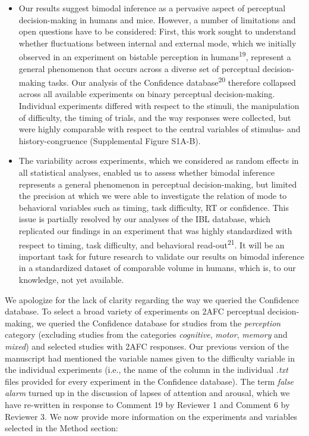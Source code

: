 \documentclass[
]{article}
\begin{document}
\begin{itemize}
\item
  Our results suggest bimodal inference as a pervasive aspect of
  perceptual decision-making in humans and mice. However, a number of
  limitations and open questions have to be considered: First, this work
  sought to understand whether fluctuations between internal and
  external mode, which we initially observed in an experiment on
  bistable perception in humans\textsuperscript{19}, represent a general
  phenomenon that occurs across a diverse set of perceptual
  decision-making tasks. Our analysis of the Confidence
  database\textsuperscript{20} therefore collapsed across all available
  experiments on binary perceptual decision-making. Individual
  experiments differed with respect to the stimuli, the manipulation of
  difficulty, the timing of trials, and the way responses were
  collected, but were highly comparable with respect to the central
  variables of stimulus- and history-congruence (Supplemental Figure
  S1A-B).
\item
  The variability across experiments, which we considered as random
  effects in all statistical analyses, enabled us to assess whether
  bimodal inference represents a general phenomenon in perceptual
  decision-making, but limited the precision at which we were able to
  investigate the relation of mode to behavioral variables such as
  timing, task difficulty, RT or confidence. This issue is partially
  resolved by our analyses of the IBL database, which replicated our
  findings in an experiment that was highly standardized with respect to
  timing, task difficulty, and behavioral read-out\textsuperscript{21}.
  It will be an important task for future research to validate our
  results on bimodal inference in a standardized dataset of comparable
  volume in humans, which is, to our knowledge, not yet available.
\end{itemize}

We apologize for the lack of clarity regarding the way we queried the
Confidence database. To select a broad variety of experiments on 2AFC
perceptual decision-making, we queried the Confidence database for
studies from the \emph{perception} category (excluding studies from the
categories \emph{cognitive}, \emph{motor}, \emph{memory} and
\emph{mixed}) and selected studies with 2AFC responses. Our previous
version of the manuscript had mentioned the variable names given to the
difficulty variable in the individual experiments (i.e., the name of the
column in the individual \emph{.txt} files provided for every experiment
in the Confidence database). The term \emph{false alarm} turned up in
the discussion of lapses of attention and arousal, which we have
re-written in response to Comment 19 by Reviewer 1 and Comment 6 by
Reviewer 3. We now provide more information on the experiments and
variables selected in the Method section:
\end{document}
